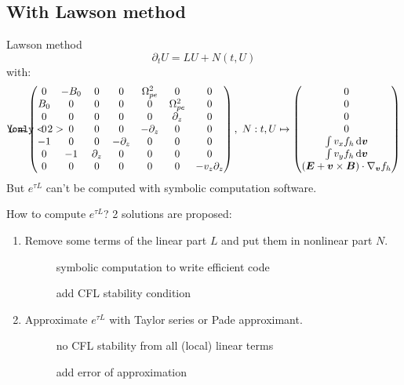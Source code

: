 \documentclass{beamer}
\newcommand{\cmark}{{\color{dgreen}\ding{52}}}
\newcommand{\xmark}{{\color{red}\ding{55}}}
\newcommand{\Mvb}[1]{\boldsymbol{#1}}
\begin{document}

\subsection{With Lawson method}
\begin{frame}{Lawson method}
  $$\partial_tU = LU + N(t,U)$$
  with:
  $$
    \only<2>{\hspace{-2cm}}
    L = \begin{pmatrix}
      0   & -B_0 & 0          &  0          &  \Omega_{pe}^2 & 0             & 0 \\ 
      B_0 &  0   & 0          &  0          &  0             & \Omega_{pe}^2 & 0 \\
      0   &  0   & 0          &  0          &  0             & \partial_z    & 0 \\ 
      0   &  0   & 0          &  0          & -\partial_z    & 0             & 0 \\ 
      -1  &  0   & 0          & -\partial_z &  0             & 0             & 0 \\ 
      0   & -1   & \partial_z &  0          &  0             & 0             & 0 \\ 
      0   &  0   & 0          &  0          &  0             & 0             & -v_z\partial_z \\ 
    \end{pmatrix}
    ,\ 
    N:t,U\mapsto\begin{pmatrix}
      0 \\
      0 \\
      0 \\
      0 \\
      \int v_xf_h\dd{\Mvb{v}} \\
      \int v_yf_h\dd{\Mvb{v}} \\
      (\Mvb{E}+\Mvb{v}\times\Mvb{B})\cdot\nabla_{\Mvb{v}}f_h
    \end{pmatrix}
  $$
  But $e^{\tau L}$ can't be computed with symbolic computation software.
\end{frame}


\begin{frame}{How to compute $e^{\tau L}$?}
  2 solutions are proposed:
  \begin{enumerate}
    \item Remove some terms of the linear part $L$ and put them in nonlinear part $N$.
      \begin{description}
        \item[\cmark] symbolic computation to write efficient code
        \item[\xmark] add CFL stability condition
      \end{description}
    \item Approximate $e^{\tau L}$ with Taylor series or Pade approximant.
      \begin{description}
        \item[\cmark] no CFL stability from all (local) linear terms
        \item[\xmark] add error of approximation
      \end{description}
  \end{enumerate}
\end{frame}
\end{document}
